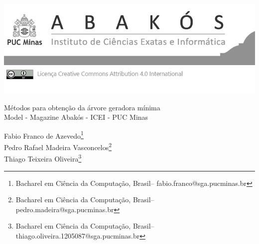 \documentclass[a4paper,12pt,Times]{article}
\makeatletter
\newcommand{\monog}{Métodos para obtenção da árvore geradora mínima}
\newcommand{\monogES}{Model - Magazine Abakós - ICEI - PUC Minas}
\newcommand{\origem}{Brasil}
\newcommand{\AutorA}{Fabio Franco de Azevedo}
\newcommand{\funcaoA}{}
\newcommand{\emailA}{fabio.franco@sga.pucminas.br}
\newcommand{\cursA}{Bacharel em Ciência da Computação}
\newcommand{\AutorB}{Pedro Rafael Madeira Vasconcelos}
\newcommand{\funcaoB}{}
\newcommand{\emailB}{pedro.madeira@sga.pucminas.br}
\newcommand{\cursB}{Bacharel em Ciência da Computação}
\newcommand{\AutorC}{Thiago Teixeira Oliveira}
\newcommand{\funcaoC}{}
\newcommand{\emailC}{thiago.oliveira.1205087@sga.pucminas.br}
\newcommand{\cursC}{Bacharel em Ciência da Computação}
\makeatother
\begin{document}

\begin{flushleft}

\begin{minipage} [c][5cm][b]{16.5cm} %
\includegraphics[scale=1.1]{figuras/pucmg.png} 
\end{minipage}

 \vspace{0cm} {
 \singlespacing \Large{\monog {} \\ }
  \normalsize{\monogES}
 }
\end{flushleft}
\begin{flushright}
\singlespacing 
\normalsize{\AutorA \footnote{\funcaoA \cursA, \origem -- \emailA }} \\
\normalsize{\AutorB \footnote{\funcaoB \cursB, \origem -- \emailB }} \\
\normalsize{\AutorC \footnote{\funcaoC \cursC, \origem -- \emailC }} \\
\end{flushright}
\thispagestyle{empty}
\end{document}
